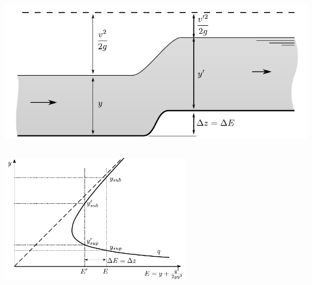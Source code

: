 \documentclass[t]{beamer}
\begin{document}
\begin{frame}
{\begin{columns}[t,onlytextwidth]
					\includegraphics[width=\textwidth]{../fig/kanaalstroming/Open_kanaal_bodemstijging_superkritisch}
			\end{columns}
			
			\center
            \includegraphics[width=0.6\textwidth]{../fig/kanaalstroming/Specifieke_energie_diagram_bodemstijging}
		}
  	\end{frame}
\end{document}
